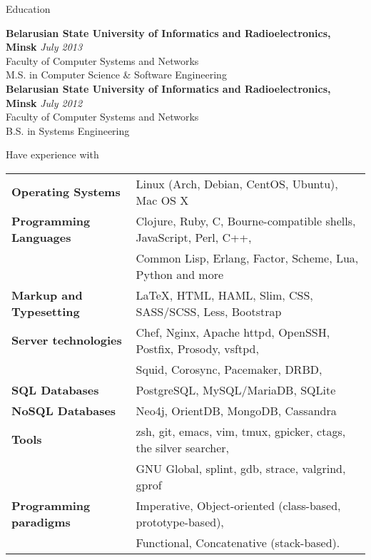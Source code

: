 \documentclass{resume} %
\begin{document}

\begin{rSection}{Education}

{\bf Belarusian State University of Informatics and Radioelectronics, Minsk} \hfill {\em July 2013} \\ 
Faculty of Computer Systems and Networks \\
M.S. in Computer Science \& Software Engineering \smallskip \\
{\bf Belarusian State University of Informatics and Radioelectronics, Minsk} \hfill {\em July 2012} \\ 
Faculty of Computer Systems and Networks \\
B.S. in Systems Engineering \\

\end{rSection}


\begin{rSection}{Have experience with}

\begin{tabular}{ @{} >{\bfseries}l @{\hspace{6ex}} l }
Operating Systems     & Linux (Arch, Debian, CentOS, Ubuntu), Mac OS X \smallskip \\
Programming Languages & Clojure, Ruby, C, Bourne-compatible shells, JavaScript, Perl, C++, \\
                      & Common Lisp, Erlang, Factor, Scheme, Lua, Python and more\smallskip \\
Markup and Typesetting & \LaTeX, HTML, HAML, Slim, CSS, SASS/SCSS, Less, Bootstrap \smallskip \\
Server technologies   & Chef, Nginx, Apache httpd, OpenSSH, Postfix, Prosody, vsftpd,\\
                      & Squid, Corosync, Pacemaker, DRBD, \smallskip \\
SQL Databases & PostgreSQL, MySQL/MariaDB, SQLite \smallskip \\
NoSQL Databases & Neo4j, OrientDB, MongoDB, Cassandra \smallskip \\
Tools & zsh, git, emacs, vim, tmux, gpicker, ctags, the silver searcher, \\
      & GNU Global, splint, gdb, strace, valgrind, gprof \smallskip \\
Programming paradigms & Imperative, Object-oriented (class-based, prototype-based), \\
                      & Functional, Concatenative (stack-based).
\end{tabular}

\end{rSection}
\end{document}
